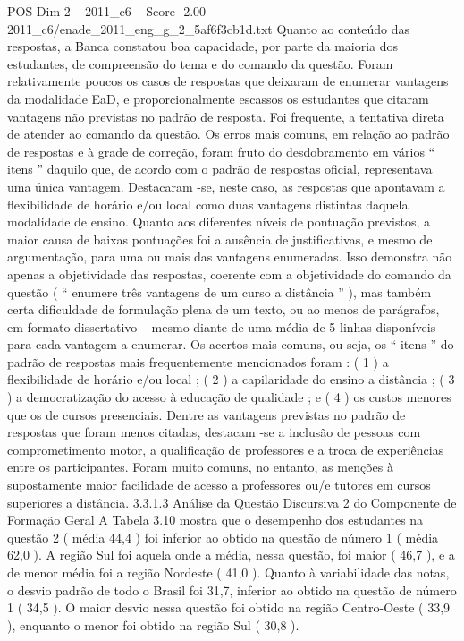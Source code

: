 \begin{textsample}{POS Dim 2 – 2011\_c6 – Score -2.00 – 2011\_c6/enade\_2011\_eng\_g\_2\_5af6f3cb1d.txt}
Quanto ao conteúdo das respostas, a Banca constatou boa capacidade, por parte da maioria dos estudantes, de compreensão do tema e do comando da questão.
Foram relativamente poucos os casos de respostas que deixaram de enumerar vantagens da modalidade EaD, e proporcionalmente escassos os estudantes que citaram vantagens não previstas no padrão de resposta.
Foi frequente, a tentativa direta de atender ao comando da questão.
Os erros mais comuns, em relação ao padrão de respostas e à grade de correção, foram fruto do desdobramento em vários “ itens ” daquilo que, de acordo com o padrão de respostas oficial, representava uma única vantagem.
Destacaram -se, neste caso, as respostas que apontavam a flexibilidade de horário e/ou local como duas vantagens distintas daquela modalidade de ensino.
Quanto aos diferentes níveis de pontuação previstos, a maior causa de baixas pontuações foi a ausência de justificativas, e mesmo de argumentação, para uma ou mais das vantagens enumeradas.
Isso demonstra não apenas a objetividade das respostas, coerente com a objetividade do comando da questão ( “ enumere três vantagens de um curso a distância ” ), mas também certa dificuldade de formulação plena de um texto, ou ao menos de parágrafos, em formato dissertativo – mesmo diante de uma média de 5 linhas disponíveis para cada vantagem a enumerar.
Os acertos mais comuns, ou seja, os “ itens ” do padrão de respostas mais frequentemente mencionados foram : ( 1 ) a flexibilidade de horário e/ou local ; ( 2 ) a capilaridade do ensino a distância ; ( 3 ) a democratização do acesso à educação de qualidade ; e ( 4 ) os custos menores que os de cursos presenciais.
Dentre as vantagens previstas no padrão de respostas que foram menos citadas, destacam -se a inclusão de pessoas com comprometimento motor, a qualificação de professores e a troca de experiências entre os participantes.
Foram muito comuns, no entanto, as menções à supostamente maior facilidade de acesso a professores ou/e tutores em cursos superiores a distância. 3.3.1.3 Análise da Questão Discursiva 2 do Componente de Formação Geral A Tabela 3.10 mostra que o desempenho dos estudantes na questão 2 ( média 44,4 ) foi inferior ao obtido na questão de número 1 ( média 62,0 ).
A região Sul foi aquela onde a média, nessa questão, foi maior ( 46,7 ), e a de menor média foi a região Nordeste ( 41,0 ).
Quanto à variabilidade das notas, o desvio padrão de todo o Brasil foi 31,7, inferior ao obtido na questão de número 1 ( 34,5 ).
O maior desvio nessa questão foi obtido na região Centro-Oeste ( 33,9 ), enquanto o menor foi obtido na região Sul ( 30,8 ).

\end{textsample}
